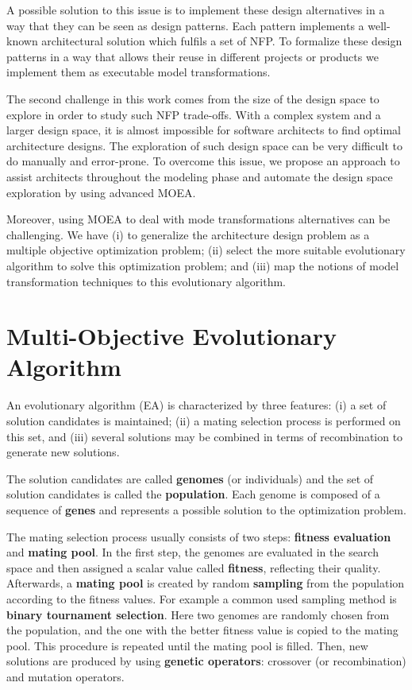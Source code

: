\documentclass[conference]{IEEEtran}
\begin{document}
A possible solution to this issue is to implement these design alternatives in a way that they can be seen as design patterns. Each pattern implements a well-known architectural solution which fulfils a set of NFP. To formalize these design patterns in a way that allows their reuse in different projects or products we implement them as executable model transformations.

The second challenge in this work comes from the size of the design space to explore in order to study such NFP trade-offs. With a complex system and a larger design space, it is almost impossible for software architects to find optimal architecture designs. The exploration of such design space can be very difficult to do manually and error-prone. To overcome this issue, we propose an approach to assist architects throughout the modeling phase and automate the design space exploration by using advanced MOEA.

Moreover, using MOEA to deal with mode transformations alternatives can be challenging. We have (i) to generalize the architecture design problem as a multiple objective optimization problem; (ii) select the more suitable evolutionary algorithm to solve this optimization problem; and (iii) map the notions of model transformation techniques to this evolutionary algorithm.

\section{Multi-Objective Evolutionary Algorithm}
\label{MOEA}

An evolutionary algorithm (EA) is characterized by three features: (i) a set of solution candidates is maintained; (ii) a mating selection process is performed on this set, and (iii) several solutions may be combined in terms of recombination to generate new solutions.

The solution candidates are called \textbf{genomes} (or individuals) and the set of solution candidates is called the \textbf{population}. Each genome is composed of a sequence of \textbf{genes} and represents a possible solution to the optimization problem.

The mating selection process usually consists of two steps: \textbf{fitness evaluation} and \textbf{mating pool}. In the first step, the genomes are evaluated in the search space and then assigned a scalar value called \textbf{fitness}, reflecting their quality. Afterwards, a \textbf{mating pool} is created by random \textbf{sampling} from the population according to the fitness values. For example a common used sampling method is \textbf{binary tournament selection}. Here two genomes are randomly chosen from the population, and the one with the better fitness value is copied to the mating pool. This procedure is repeated until the mating pool is filled. Then, new solutions are produced by using \textbf{genetic operators}: crossover (or recombination) and mutation operators.
\end{document}
